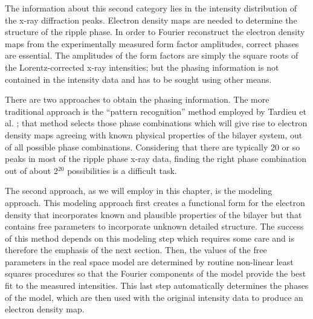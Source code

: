 The information about this second category lies in the intensity distribution 
of the x-ray diffraction peaks. 
Electron density maps are needed to determine the 
structure of the ripple phase. In order to Fourier reconstruct the 
electron density 
maps from the experimentally measured form factor amplitudes, 
correct phases are essential. The amplitudes of the form factors are 
simply the square roots of the Lorentz-corrected x-ray intensities;
but the phasing information is not contained in the 
intensity data and has to be sought using other means.

There are two approaches to obtain the phasing information.
The more traditional approach is the ``pattern recognition''
method employed by Tardieu et al. \cite{Tar73}; that method 
selects those phase combinations which will give rise to electron density maps 
agreeing with known physical properties of the bilayer system, out of all 
possible phase combinations. Considering that there are typically 20 or so 
peaks in most of the ripple phase x-ray data, finding the right phase 
combination out of about 2$^{20}$ possibilities is a difficult task. 

The second approach, as we will employ in this chapter, is the modeling 
approach. This modeling approach first creates a functional form for the 
electron density that incorporates known and plausible properties of the 
bilayer but that contains free parameters to incorporate unknown detailed 
structure. The success of this method depends on this modeling step which 
requires some care and is therefore the emphasis of the next section.
Then, the values of the free parameters in the real space model are 
determined by routine non-linear least squares procedures so that the Fourier
components of the model provide the best fit to the measured intensities.
This last step automatically determines the phases of the model, which are
then used with the original intensity data to produce an electron density map.



